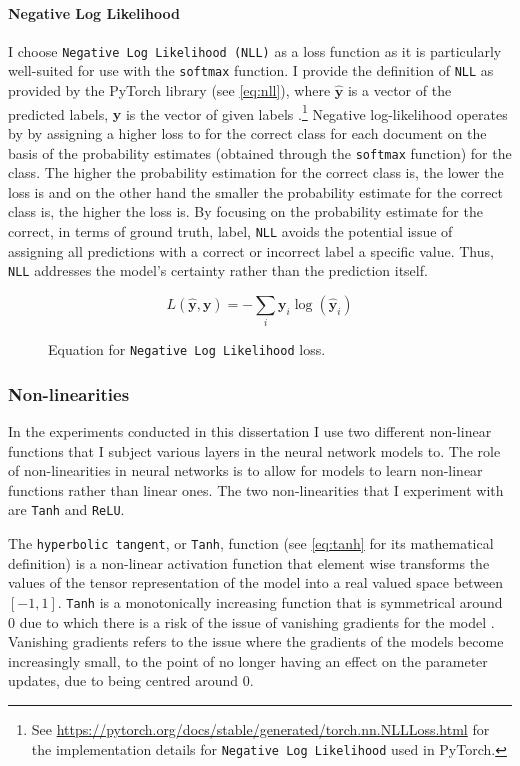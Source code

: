 \paragraph{Negative Log Likelihood} I choose \texttt{Negative Log Likelihood (NLL)} as a loss function as it is particularly well-suited for use with the \texttt{softmax} function.
I provide the definition of \texttt{NLL} as provided by the PyTorch library \citep{Paszke:2019} (see \cref{eq:nll}), where $\hat{\mathbf{y}}$ is a vector of the predicted labels, $\mathbf{y}$ is the vector of given labels \citep{Goldberg:2017}.\footnote{See \url{https://pytorch.org/docs/stable/generated/torch.nn.NLLLoss.html} for the implementation details for \texttt{Negative Log Likelihood} used in PyTorch.}
Negative log-likelihood operates by by assigning a higher loss to for the correct class for each document on the basis of the probability estimates (obtained through the \texttt{softmax} function) for the class. 
The higher the probability estimation for the correct class is, the lower the loss is and on the other hand the smaller the probability estimate for the correct class is, the higher the loss is.
By focusing on the probability estimate for the correct, in terms of ground truth, label, \texttt{NLL} avoids the potential issue of assigning all predictions with a correct or incorrect label a specific value. 
Thus, \texttt{NLL} addresses the model's certainty rather than the prediction itself.

\begin{figure}[h]
  \begin{equation}\label{eq:nll}
    \mathit{L}(\hat{\mathbf{y}}, \mathbf{y}) = -\sum_{i} \mathbf{y}_i\log(\hat{\mathbf{y}}_i)
  \end{equation}
  \caption{Equation for \texttt{Negative Log Likelihood} loss.}
\end{figure}

\subsubsection{Non-linearities}

In the experiments conducted in this dissertation I use two different non-linear functions that I subject various layers in the neural network models to. 
The role of non-linearities in neural networks is to allow for models to learn non-linear functions rather than linear ones. 
The two non-linearities that I experiment with are \texttt{Tanh} and \texttt{ReLU}.

The \texttt{hyperbolic tangent}, or \texttt{Tanh}, function (see \cref{eq:tanh} for its mathematical definition) is a non-linear activation function that element wise transforms the values of the tensor representation of the model into a real valued space between $[-1, 1]$.
\texttt{Tanh} is a monotonically increasing function that is symmetrical around $0$ due to which there is a risk of the issue of vanishing gradients for the model \citep{Teuwen:2020}.
Vanishing gradients refers to the issue where the gradients of the models become increasingly small, to the point of no longer having an effect on the parameter updates, due to being centred around $0$.

